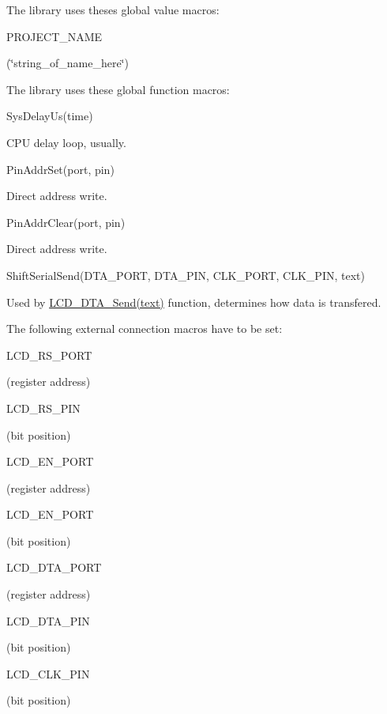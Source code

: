 The library uses theses global value macros\-:
\begin{DoxyItemize}
\item P\-R\-O\-J\-E\-C\-T\-\_\-\-N\-A\-M\-E \par
 (\char`\"{}string\-\_\-of\-\_\-name\-\_\-here\char`\"{})
\end{DoxyItemize}

The library uses these global function macros\-:
\begin{DoxyItemize}
\item Sys\-Delay\-Us(time) \par
 C\-P\-U delay loop, usually.
\item Pin\-Addr\-Set(port, pin) \par
 Direct address write.
\item Pin\-Addr\-Clear(port, pin) \par
 Direct address write.
\item Shift\-Serial\-Send(\-D\-T\-A\-\_\-\-P\-O\-R\-T, D\-T\-A\-\_\-\-P\-I\-N, C\-L\-K\-\_\-\-P\-O\-R\-T, C\-L\-K\-\_\-\-P\-I\-N, text) \par
 Used by \hyperlink{group__lcd__h_gad70516201ea275cdb7b698f8782bd0b6}{L\-C\-D\-\_\-\-D\-T\-A\-\_\-\-Send(text)} function, determines how data is transfered.
\end{DoxyItemize}

The following external connection macros have to be set\-:
\begin{DoxyItemize}
\item L\-C\-D\-\_\-\-R\-S\-\_\-\-P\-O\-R\-T \par
 (register address)
\item L\-C\-D\-\_\-\-R\-S\-\_\-\-P\-I\-N \par
 (bit position)
\item L\-C\-D\-\_\-\-E\-N\-\_\-\-P\-O\-R\-T \par
 (register address)
\item L\-C\-D\-\_\-\-E\-N\-\_\-\-P\-O\-R\-T \par
(bit position)
\item L\-C\-D\-\_\-\-D\-T\-A\-\_\-\-P\-O\-R\-T \par
 (register address)
\item L\-C\-D\-\_\-\-D\-T\-A\-\_\-\-P\-I\-N \par
 (bit position)
\item L\-C\-D\-\_\-\-C\-L\-K\-\_\-\-P\-I\-N \par
 (bit position) 
\end{DoxyItemize}

